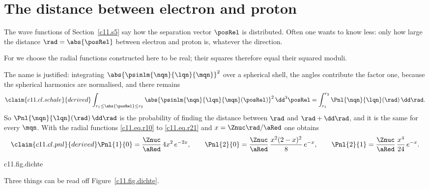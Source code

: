 \section{The distance between electron and proton}\label{c11.s7}

The wave functions of Section~\ref{c11.s5} say how the separation vector $\posRel$ is
distributed. Often one wants to know less: only how large the distance
$\rad = \abs{\posRel}$ between electron and proton is, whatever the direction.

For  we choose the radial functions constructed here to be real; their
squares therefore equal their squared moduli.


The name is justified: integrating $\abs{\psinlm{\nqn}{\lqn}{\mqn}}^2$ over a spherical
shell, the angles contribute the factor one, because the spherical harmonics are
normalised, and there remains
\begin{equation}\label{c11.eq.schale}\claim{c11.cl.schale}{derived}
  \int_{r_1 \leq \abs{\posRel} \leq r_2} \abs{\psinlm{\nqn}{\lqn}{\mqn}(\posRel)}^2\,\dd^3\posRel
  = \int_{r_1}^{r_2} \Pnl{\nqn}{\lqn}(\rad)\,\dd\rad .
\end{equation}
So $\Pnl{\nqn}{\lqn}(\rad)\,\dd\rad$ is the probability of finding the distance between
$\rad$ and $\rad + \dd\rad$, and it is the same for every $\mqn$. With the radial
functions \eqref{c11.eq.r10} to \eqref{c11.eq.r21} and $x = \Znuc\rad/\aRed$ one obtains
\begin{equation}\label{c11.eq.pnl}\claim{c11.cl.pnl}{derived}
  \Pnl{1}{0} = \frac{\Znuc}{\aRed}\,4x^2\,e^{-2x},
  \qquad
  \Pnl{2}{0} = \frac{\Znuc}{\aRed}\,\frac{x^2(2 - x)^2}{8}\,e^{-x},
  \qquad
  \Pnl{2}{1} = \frac{\Znuc}{\aRed}\,\frac{x^4}{24}\,e^{-x} .
\end{equation}

\begin{tpcfigure}{c11.fig.dichte}
  \caption{The radial probability densities \eqref{c11.eq.pnl} for $\Znuc = 1$. Solid
    1s, dashed 2s, dash-dotted 2p. The dotted line marks the maximum of $\Pnl{1}{0}$ at
    $\rad = \aRed$, the dot the node of $\Pnl{2}{0}$ at $\rad = 2\aRed$. The short
    strokes below the axis are the mean distances \eqref{c11.eq.mittel}. All curves
    start at zero, including those of the s states: the factor $\rad^2$ comes from the
    volume of the spherical shell.}
\end{tpcfigure}

Three things can be read off Figure~\ref{c11.fig.dichte}.


